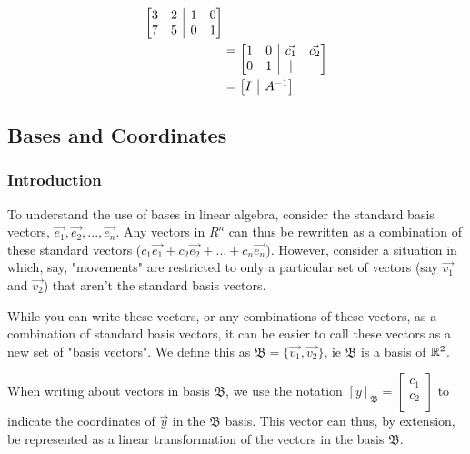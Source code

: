 \documentclass[12pt]{article}
\begin{document}
\begin{equation}
    \begin{split}
        \begin{array}[t][{@{}cc|cc@{}}]
             3 & 2 & 1 & 0\\
             7 & 5 & 0 & 1\\
            \end{array}&\\
    &=\begin{array}[t][{@{}cc|cc@{}}]
             1 & 0 & \vec{c_1} & \vec{c_2}\\
             0 & 1 & | & |\\
        \end{array}\\
    &=\begin{array}[t][{@{}c|c@{}}]
             I & A^{-1}\\
        \end{array}\\
    \end{split}
\end{equation}

\subsection{Bases and Coordinates}

\subsubsection{Introduction}
To understand the use of bases in linear algebra, consider the standard basis vectors, $\vec{e_1}, \vec{e_2}, ..., \vec{e_n}$. Any vectors in $R^n$ can thus be rewritten as a combination of these standard vectors ($c_1\vec{e_1} + c_2\vec{e_2} + ... + c_n\vec{e_n}$). However, consider a situation in which, say, "movements" are restricted to only a particular set of vectors (say $\vec{v_1}$ and $\vec{v_2}$) that aren't the standard basis vectors. 

While you can write these vectors, or any combinations of these vectors, as a combination of standard basis vectors, it can be easier to call these vectors as a new set of "basis vectors". We define this as $\mathfrak{B} = \{\vec{v_1}, \vec{v_2}\}$, ie $\mathfrak{B}$ is a basis of $\mathbb{R}^2$.

When writing about vectors in basis $\mathfrak{B}$, we use the notation $[y]_{\mathfrak{B}} = \begin{bmatrix}
    c_1\\
    c_2\\
\end{bmatrix}$ to indicate the coordinates of $\Vec{y}$ in the $\mathfrak{B}$ basis. This vector can thus, by extension, be represented as a linear transformation of the vectors in the basis $\mathfrak{B}$.
\end{document}
